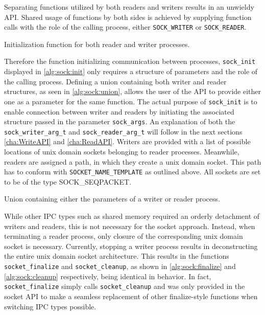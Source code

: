 Separating functions utilized by both readers and writers results in an unwieldy \ac{API}.
Shared usage of functions by both sides is achieved by supplying function calls with the role of the calling process, either \texttt{SOCK\_WRITER} or \texttt{SOCK\_READER}.

\begin{algorithm}[h!]
    
    \caption[Socket: Socket initialization]{Initialization function for both reader and writer processes.}
    \label{alg:sock:init}
\end{algorithm}

Therefore the function initializing communication between processes, \texttt{sock\_init} displayed in \ref{alg:sock:init} only requires a structure of parameters and the role of the calling process.
Defining a union containing both writer and reader structures, as seen in \ref{alg:sock:union}, allows the user of the \ac{API} to provide either one as a parameter for the same function.
The actual purpose of \texttt{sock\_init} is to enable connection between writer and readers by initiating the associated structure passed in the parameter \texttt{sock\_args}.
An explanation of both the \texttt{sock\_writer\_arg\_t} and \texttt{sock\_reader\_arg\_t} will follow in the next sections \ref{cha:WriteAPI} and \ref{cha:ReadAPI}.
Writers are provided with a list of possible locations of unix domain sockets belonging to reader processes.
Meanwhile, readers are assigned a path, in which they create a unix domain socket.
This path has to conform with \texttt{SOCKET\_NAME\_TEMPLATE} as outlined above.
All sockets are set to be of the type SOCK\_SEQPACKET.

\begin{algorithm}[h!]
    
    \caption[Socket: Union for flexible function calling]{Union containing either the parameters of a writer or reader process.}
    \label{alg:sock:union}
\end{algorithm}

While other \ac{IPC} types such as shared memory required an orderly detachment of writers and readers, this is not necessary for the socket approach.
Instead, when terminating a reader process, only closure of the corresponding unix domain socket is necessary.
Currently, stopping a writer process results in deconstructing the entire unix domain socket architecture.
This results in the functions \texttt{socket\_finalize} and \texttt{socket\_cleanup}, as shown in \ref{alg:sock:finalize} and \ref{alg:sock:cleanup} respectively, being identical in behavior.
In fact, \texttt{socket\_finalize} simply calls \texttt{socket\_cleanup} and was only provided in the socket \ac{API} to make a seamless replacement of other finalize-style functions when switching \ac{IPC} types possible.

